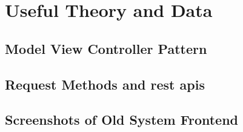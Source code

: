 \chapter{Useful Theory and Data}
\label{apdx:theory}

\section{Model View Controller Pattern}

\section{Request Methods and \gls{rest} \glspl{api}}

\section{Screenshots of Old System Frontend}
